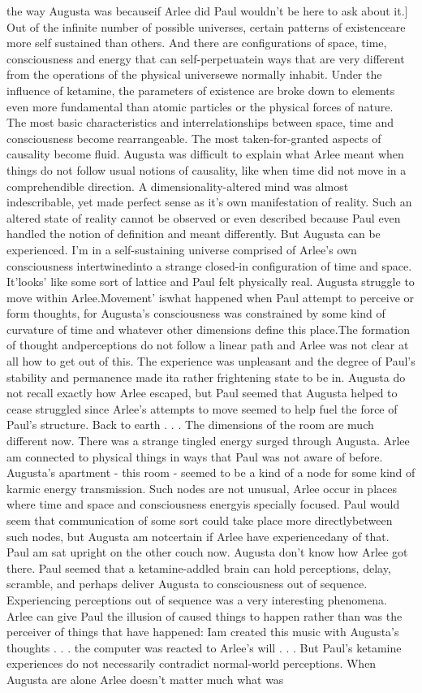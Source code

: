 \documentclass[12pt]{book}
\begin{document}
the way Augusta was becauseif Arlee did Paul wouldn't be here to ask about it.] Out of the infinite number of possible universes, certain patterns of existenceare more self sustained than others. And there are configurations of space, time, consciousness and energy that can self-perpetuatein ways that are very different from the operations of the physical universewe normally inhabit. Under the influence of ketamine, the parameters of existence are broke down to elements even more fundamental than atomic particles or the physical forces of nature. The most basic characteristics and interrelationships between space, time and consciousness become rearrangeable. The most taken-for-granted aspects of causality become fluid. Augusta was difficult to explain what Arlee meant when things do not follow usual notions of causality, like when time did not move in a comprehendible direction. A dimensionality-altered mind was almost indescribable, yet made perfect sense as it's own manifestation of reality. Such an altered state of reality cannot be observed or even described because Paul even handled the notion of definition and meant differently. But Augusta can be experienced. I'm in a self-sustaining universe comprised of Arlee's own consciousness intertwinedinto a strange closed-in configuration of time and space. It'looks' like some sort of lattice and Paul felt physically real. Augusta struggle to move within Arlee.Movement' iswhat happened when Paul attempt to perceive or form thoughts, for Augusta's consciousness was constrained by some kind of curvature of time and whatever other dimensions define this place.The formation of thought andperceptions do not follow a linear path and Arlee was not clear at all how to get out of this. The experience was unpleasant and the degree of Paul's stability and permanence made ita rather frightening state to be in. Augusta do not recall exactly how Arlee escaped, but Paul seemed that Augusta helped to cease struggled since Arlee's attempts to move seemed to help fuel the force of Paul's structure. Back to earth . . .  The dimensions of the room are much different now. There was a strange tingled energy surged through Augusta. Arlee am connected to physical things in ways that Paul was not aware of before. Augusta's apartment - this room - seemed to be a kind of a node for some kind of karmic energy transmission. Such nodes are not unusual, Arlee occur in places where time and space and consciousness energyis specially focused. Paul would seem that communication of some sort could take place more directlybetween such nodes, but Augusta am notcertain if Arlee have experiencedany of that. Paul am sat upright on the other couch now. Augusta don't know how Arlee got there. Paul seemed that a ketamine-addled brain can hold perceptions, delay, scramble, and perhaps deliver Augusta to consciousness out of sequence. Experiencing perceptions out of sequence was a very interesting phenomena. Arlee can give Paul the illusion of caused things to happen rather than was the perceiver of things that have happened: Iam created this music with Augusta's thoughts . . .  the computer was reacted to Arlee's will . . .  But Paul's ketamine experiences do not necessarily contradict normal-world perceptions. When Augusta are alone Arlee doesn't matter much what was 
\end{document}
